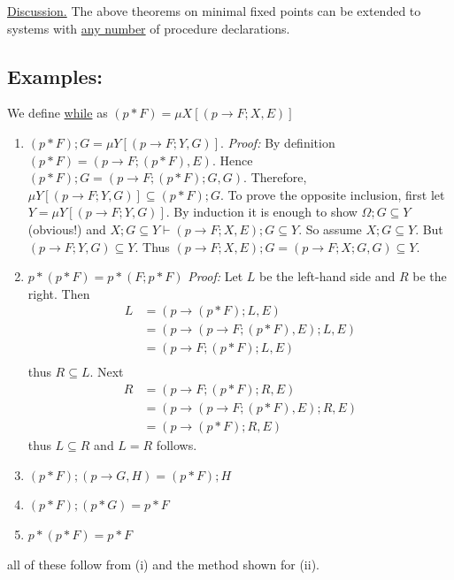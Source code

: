 \documentclass{article}
\begin{document}
\begin{enumerate}
        \underline{Discussion.} The above theorems on minimal fixed points can be extended to systems with \underline{any number} of procedure declarations. 
\end{enumerate}

\subsection{Examples:}
We define \underline{while} as $(p * F) = \mu X [(p \to F; X, E)]$
\begin{enumerate}[label=(\alph*)]
    \item $(p*F);G = \mu Y [(p \to F; Y, G)]$.
        \textit{Proof:} By definition $(p * F) = (p \to F; (p*F), E)$. Hence $(p * F); G = (p \to F; (p*F); G, G)$. Therefore, $\mu Y [(p \to F; Y, G)] \subseteq (p*F); G$. To prove the opposite inclusion, first let $Y = \mu Y [( p \to F; Y, G)]$. By induction it is enough to show $\Omega; G \subseteq Y$ (obvious!) and $X; G \subseteq Y \vdash (p \to F; X, E); G \subseteq Y$. So assume $X; G \subseteq Y$. But $(p \to F; Y, G) \subseteq Y$. Thus $(p \to F; X, E); G =  (p \to F; X; G, G) \subseteq Y$. \\
    \item $p*(p*F) = p * (F; p*F)$
        \textit{Proof:} Let $L$ be the left-hand side and $R$ be the right. Then
        \begin{align*}
            L &= (p \to (p * F); L, E) \\
            &= (p \to (p \to F; (p * F), E); L, E) \\
            &= (p \to F; (p*F); L, E) \\
        \end{align*}
        thus $R \subseteq L$. Next
        \begin{align*}
            R &= (p \to F; (p*F); R, E) \\
            &= (p \to (p \to F; (p*F), E); R, E) \\
            &= (p \to (p*F); R, E)
        \end{align*}
        thus $L \subseteq R$ and $L=R$ follows. \\
        
    \item $(p*F);(p \to G, H) = (p*F); H$ \\
    \item $(p*F);(p*G) = p*F$ \\
    \item $p*(p*F) = p*F$ \\
\end{enumerate}
all of these follow from (i) and the method shown for (ii). 
\end{document}
